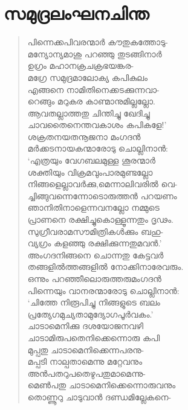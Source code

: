 
\section{സമുദ്രലംഘനചിന്ത}

\begin{verse}
പിന്നെക്കപിവരന്മാര്‍ കൗതുകത്തോടു-\\
മന്യോന്യമാശു പറഞ്ഞു തുടങ്ങിനാര്‍\\
ഉഗ്രം മഹാനക്രചക്രഭയങ്കര-\\
മഗ്രേ സമുദ്രമാലോക്യ കപികുലം\\
എങ്ങനെ നാമിതിനെക്കടക്കുന്നവാ-\\
റെങ്ങും മറുകര കാണ്മാനുമില്ലല്ലോ.\\
ആവതല്ലാത്തതു ചിന്തിച്ചു ഖേദിച്ചു\\
ചാവതൈനെന്തവകാശം കപികളേ!’\\
ശക്രതനയതനൂജനാ മംഗദന്‍\\
മര്‍ക്കടനായകന്മാരോടു ചൊല്ലിനാന്‍:\\
‘എത്രയും വേഗബലമുള്ള ശൂരന്മാര്‍\\
ശക്തിയും വിക്രമവുംപാരമുണ്ടല്ലോ\\
നിങ്ങളെല്ലാവര്‍ക്കു,മെന്നാലിവരില്‍ വെ-\\
ച്ചിങ്ങുവന്നെന്നോടൊരുത്തന്‍ പറയണം\\
ഞാനിതിനാളെന്നവനല്ലോ നമ്മുടെ\\
പ്രാണനെ രക്ഷിച്ചുകൊള്ളൂന്നതും ദൃഢം.\\
സുഗ്രീവരാമസൗമിത്രികള്‍ക്കും ബഹു-\\
വ്യഗ്രം കളഞ്ഞു രക്ഷിക്കുന്നതുമവന്‍.’\\
അംഗദനിങ്ങനെ ചൊന്നതു കേട്ടവര്‍\\
തങ്ങളില്‍ത്തങ്ങളില്‍ നോക്കിനാരേവരും.\\
ഒന്നും പറഞ്ഞീലൊരുത്തരുമംഗദന്‍\\
പിന്നെയും വാനരന്മാരോടു ചൊല്ലിനാന്‍:\\
‘ചിത്തേ നിരൂപിച്ചു നിങ്ങളുടെ ബലം\\
പ്രത്യേഗമുച്യതാമുദ്യോഗപൂര്‍വകം.’\\
ചാടാമെനിക്കു ദശയോജനവഴി\\
ചാടാമിരുപതെനിക്കെന്നൊരു കപി\\
മുപ്പതു ചാടാമെനിക്കെന്നപരനു-\\
മപ്പടി നാല്പതാമെന്നു മറ്റേവനും\\
അന്‍പതറുപതെഴുപതുമാമെന്നു-\\
മെണ്‍പതു ചാടാമെനിക്കെന്നൊരുവനും\\
തൊണ്ണൂറു ചാടുവാന്‍ ദണ്ഡമില്ലേകനെ-\\

\end{verse}
